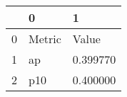 \begin{tabular}{lll}
\toprule
 & 0 & 1 \\
\midrule
0 & Metric & Value \\
1 & ap & 0.399770 \\
2 & p10 & 0.400000 \\
\bottomrule
\end{tabular}
